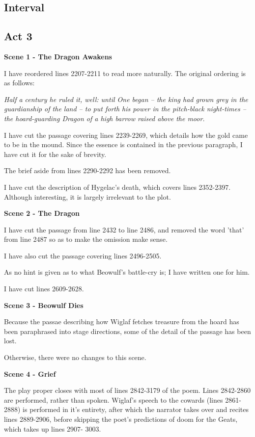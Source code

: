 \documentclass[a4paper]{article}
\begin{document}
{\subsection{Interval}%

\subsection{Act 3}%

\centerline{\textbf{Scene 1 - The Dragon Awakens}}

I have reordered lines 2207-2211 to read more naturally.
The original ordering is as follows:

\textit{ Half a century
he ruled it, well: until One began
– the king had grown grey in the guardianship of the land –
to put forth his power in the pitch-black night-times
– the hoard-guarding Dragon of a high barrow
raised above the moor.}

I have cut the passage covering lines 2239-2269, which
details how the gold came to be in the mound. Since the
essence is contained in the previous paragraph, I have
cut it for the sake of brevity.

The brief aside from lines 2290-2292 has been removed.

I have cut the description of Hygelac's death, which 
covers lines 2352-2397. Although interesting, it is 
largely irrelevant to the plot.

\centerline{\textbf{Scene 2 - The Dragon}}

I have cut the passage from line 2432 to line 2486, 
and removed the word 'that' from line 2487 so as to
make the omission make sense.

I have also cut the passage covering lines 
2496-2505.

As no hint is given as to what Beowulf's battle-cry
is; I have written one for him. 

I have cut lines 2609-2628.

\centerline{\textbf{Scene 3 - Beowulf Dies}}

Because the passae describing how Wiglaf fetches treasure
from the hoard has been paraphrased into stage directions,
some of the detail of the passage has been lost.

Otherwise, there were no changes to this scene.

\centerline{\textbf{Scene 4 - Grief}}

The play proper closes with most of lines 2842-3179 of the poem.
Lines 2842-2860 are performed, rather than spoken.  
Wiglaf's speech to the cowards (lines 2861-2888) is performed in it's entirety, 
after which the narrator takes over and recites lines 2889-2906, before skipping 
the poet's predictions of doom for the Geats, which takes up lines 2907- 3003.

}
\end{document}
